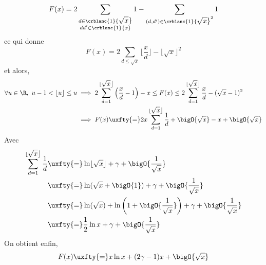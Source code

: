 \documentclass{book}
\begin{document}
\begin{enumerate}
		$$F(x)=2\sum\limits_{\substack{d\in \crblanc{1}{\displaystyle\sqrt x}\\dd'\in \crblanc{1}{x}}}1-\sum\limits_{(d,d')\in \crblanc{1}{\displaystyle\sqrt x}^2}1$$
		ce qui donne
		$$F(x)=2\sum\limits_{d\leq\displaystyle\sqrt x}\lfloor\frac{x}{d}\rfloor-\lfloor\displaystyle\sqrt x\rfloor^2$$
		et alors,
		\begin{align*}
			\forall u\in \R,\ u-1<\lfloor u\rfloor\leq u&\implies 2\sum\limits_{d=1}^{\lfloor\displaystyle\sqrt x\rfloor}\left(\frac{x}{d}-1\right)-x\leq F(x)\leq 2\sum\limits_{d=1}^{\lfloor\displaystyle\sqrt x\rfloor}\frac{x}{d}-(\displaystyle\sqrt x-1)^2\\
			&\implies F(x)\uxfty{=}2x\displaystyle\sum\limits_{d=1}^{\lfloor\displaystyle\sqrt x\rfloor}\frac{1}{d}+\bigO{\displaystyle\sqrt x}-x+\bigO{\displaystyle\sqrt x}
		\end{align*}
		Avec \begin{align*}
			\displaystyle\sum\limits_{d=1}^{\lfloor\displaystyle\sqrt x\rfloor}\frac{1}{d}&\uxfty{=}\ln\lfloor\displaystyle\sqrt x\rfloor+\gamma+\bigO{\frac{1}{\displaystyle\sqrt x}}\\
			&\uxfty{=}\ln(\displaystyle\sqrt x+\bigO{1})+\gamma+\bigO{\frac{1}{\displaystyle\sqrt x}}\\
			&\uxfty{=}\ln(\displaystyle\sqrt x)+\ln\left(1+\bigO{\frac{1}{\displaystyle\sqrt x}}\right)+\gamma+\bigO{\frac{1}{\displaystyle\sqrt x}}\\
			&\uxfty{=}\displaystyle\frac{1}{2}\ln x+\gamma+\bigO{\frac{1}{\displaystyle\sqrt x}}
		\end{align*}
		On obtient enfin,
		$$F(x)\uxfty{=}x\ln x+(2\gamma-1)x+\bigO{\displaystyle\sqrt x}$$
	\end{enumerate}
	
	
\end{document}
